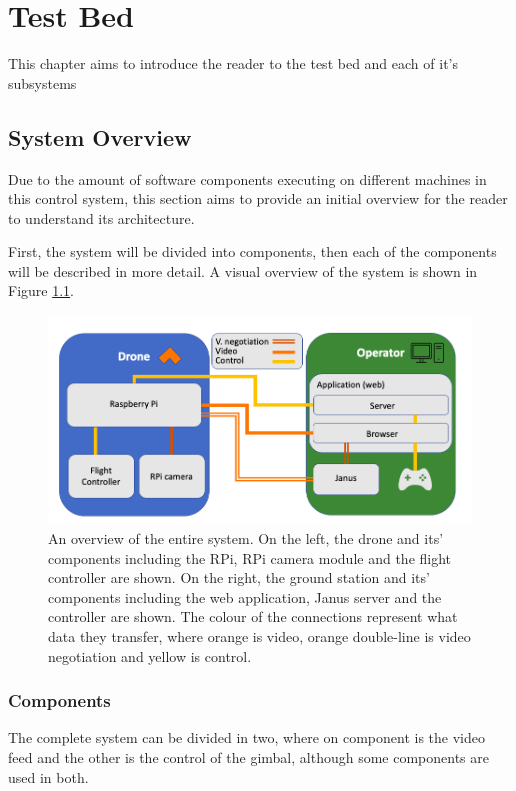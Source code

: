 \documentclass[nofilelist]{cslthse-msc}
\begin{document}
\chapter{Test Bed}
This chapter aims to introduce the reader to the test bed and each of it's subsystems

\section{System Overview}
Due to the amount of software components executing on different machines in this control system, this section aims to provide an initial overview for the reader to understand its architecture.

First, the system will be divided into components, then each of the components will be described in more detail. A visual overview of the system is shown in Figure \ref{fig:system-overview}.
\begin{figure}[!hbt]
   \centering
   \includegraphics[scale=0.5]{images/system-overview.png} 
   \caption{An overview of the entire system. On the left, the drone and its' components including the RPi, RPi camera module and the flight controller are shown. On the right, the ground station and its' components including the web application, Janus server and the controller are shown. The colour of the connections represent what data they transfer, where orange is video, orange double-line is video negotiation and yellow is control.}
   \label{fig:system-overview}
\end{figure}

\subsection{Components}
The complete system can be divided in two, where on component is the video feed and the other is the control of the gimbal, although some components are used in both.
\end{document}
